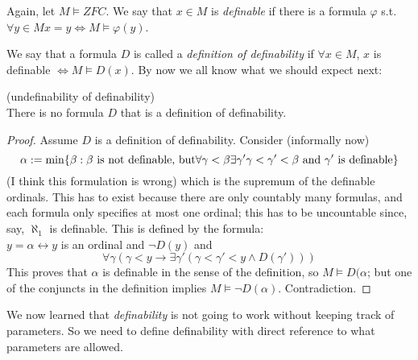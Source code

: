 \documentclass[a4paper]{article}
\begin{document}
Again, let $M \vDash ZFC$. We say that $x \in M$ is \emph{definable} if there is a formula $\varphi$ s.t. $\forall y \in M x=y \iff M \vDash \varphi(y)$.

We say that a formula $D$ is called a \emph{definition of definability} if $\forall x \in M$, $x$ is definable $\iff M \vDash D(x)$. By now we all know what we should expect next:

\begin{thm} (undefinability of definability)\\
There is no formula $D$ that is a definition of definability.
\begin{proof}
Assume $D$ is a definition of definability. Consider (informally now)
\[
\alpha := \min\{ \beta: \beta \text{ is not definable, but} \forall \gamma < \beta \exists \gamma' \gamma < \gamma' < \beta \text{ and } \gamma' \text{ is definable}\}\\
\]
(I think this formulation is wrong) which is the supremum of the definable ordinals. This has to exist because there are only countably many formulas, and each formula only specifies at most one ordinal; this has to be uncountable since, say, $\aleph_1$ is definable. This is defined by the formula:\\
$y = \alpha \leftrightarrow y$ is an ordinal and $\neg D(y)$ and
\[
\forall \gamma (\gamma < y \to \exists \gamma' (\gamma < \gamma' < y \wedge D(\gamma')))
\]
This proves that $\alpha$ is definable in the sense of the definition, so $M \vDash D(\alpha$; but one of the conjuncts in the definition implies $M \vDash \neg D(\alpha)$. Contradiction.
\end{proof}
\end{thm}

We now learned that \emph{definability} is not going to work without keeping track of parameters. So we need to define definability with direct reference to what parameters are allowed.
\end{document}
